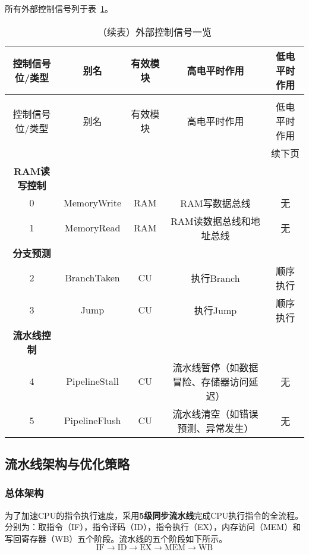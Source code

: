 \documentclass[lang=cn,a4paper,newtx]{elegantpaper}
\begin{document}
所有外部控制信号列于表~\ref{tab:CPU:ExternalControl}。
\begin{longtable}{c c c c c}
  \caption{外部控制信号一览} \label{tab:CPU:ExternalControl} \\
  \toprule
  控制信号位/类型 & 别名  & 有效模块 & 高电平时作用 & 低电平时作用\\
  \midrule
  \endfirsthead

  \caption[]{（续表）外部控制信号一览} \\
  \toprule
  控制信号位/类型 & 别名  & 有效模块 & 高电平时作用 & 低电平时作用 \\
  \midrule
  \endhead

  \midrule
  \multicolumn{5}{r}{续下页} \\
  \midrule
  \endfoot

  \bottomrule
  \endlastfoot
  \textbf{RAM读写控制}\\
  \hline
  0  & MemoryWrite    & RAM  & RAM写数据总线 & 无\\
  1  & MemoryRead     & RAM  & RAM读数据总线和地址总线 & 无\\
  \hline
  \textbf{分支预测} \\
  \hline
  2   & BranchTaken    & CU   & 执行Branch     & 顺序执行 \\
  3   & Jump            & CU  & 执行Jump        & 顺序执行 \\
  \hline
  \textbf{流水线控制}  \\
  \hline
  4   & PipelineStall & CU    & 流水线暂停（如数据冒险、存储器访问延迟） & 无 \\
  5   & PipelineFlush & CU    & 流水线清空（如错误预测、异常发生）      & 无 \\

\end{longtable}
\subsection{流水线架构与优化策略}
\subsubsection{总体架构}
为了加速CPU的指令执行速度，采用\textbf{5级同步流水线}完成CPU执行指令的全流程。分别为：取指令（IF），指令译码（ID），指令执行（EX），内存访问（MEM）和写回寄存器（WB）五个阶段。流水线的五个阶段如下所示。
$$
  \text{IF} \rightarrow \text{ID} \rightarrow \text{EX} \rightarrow \text{MEM} \rightarrow \text{WB}
$$
\end{document}
